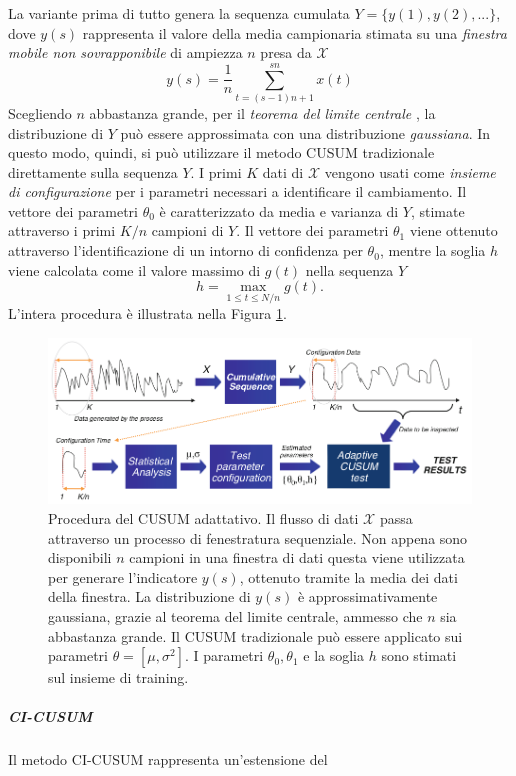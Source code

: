 La variante prima di tutto genera la sequenza cumulata
$Y=\{y(1),y(2),...\}$, dove $y(s)$ rappresenta il
valore della media campionaria stimata su una
\textit{finestra mobile non sovrapponibile} di
ampiezza $n$ presa da $\mathcal{X}$
\[ y(s) = \frac{1}{n} \sum_{t=(s-1)n+1}^{sn}x(t) \]
Scegliendo $n$ abbastanza grande, per il
\textit{teorema del limite centrale}
\cite{ross2009introduction}, la distribuzione di $Y$
pu\`o essere approssimata con una distribuzione
\textit{gaussiana}. In questo modo, quindi, si pu\`o
utilizzare il metodo CUSUM tradizionale direttamente
sulla sequenza $Y$. I primi $K$ dati di $\mathcal{X}$ vengono
usati come \textit{insieme di configurazione} per i
parametri necessari a identificare il cambiamento. Il
vettore dei parametri $\theta_0$ \`e caratterizzato da
media e varianza di $Y$, stimate attraverso i primi
$K/n$ campioni di $Y$. Il vettore dei parametri
$\theta_1$ viene ottenuto attraverso l'identificazione
di un intorno di confidenza per $\theta_0$, mentre la
soglia $h$ viene calcolata come il valore massimo di
$g(t)$ nella sequenza $Y$
\[ h=\max_{1\leq t\leq N/n}g(t). \]
\noindent L'intera procedura \`e illustrata nella
Figura \ref{fig:adaptiveCUSUM}.
\begin{figure}
	\centering
	\includegraphics[width=12cm,keepaspectratio]{pictures/adaptiveCUSUM}
	\caption[Procedura del CUSUM
		adattativo]{Procedura del CUSUM
			adattativo. Il flusso di dati $\mathcal{X}$ passa attraverso un processo di fenestratura sequenziale. Non appena sono disponibili $n$ campioni in una finestra di dati questa viene utilizzata per generare l'indicatore $y(s)$, ottenuto tramite la media dei dati della finestra. La distribuzione di $y(s)$ \`e approssimativamente gaussiana, grazie al teorema del limite centrale, ammesso che $n$ sia abbastanza grande. Il CUSUM tradizionale pu\`o essere applicato sui parametri $\theta=[\mu,\sigma^2]$. I parametri $\theta_0,\theta_1$ e la soglia $h$ sono stimati sul insieme di training.}
	\label{fig:adaptiveCUSUM}
\end{figure}
\subparagraph{CI-CUSUM} Il metodo
CI-CUSUM rappresenta un'estensione del

